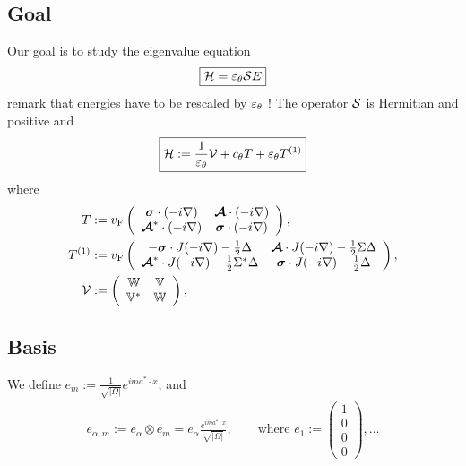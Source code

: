 \documentclass[11pt,a4paper,reqno,french,tikz]{amsart}
\newcommand{\ab}[1]{\left|#1\right|} %
\let\p\relax\newcommand{\p}{\psi} %
\newcommand{\f}[2]{\frac{#1}{#2}} %
\newcommand{\mat}[1]{\begin{pmatrix} #1 \end{pmatrix}} %
\newcommand{\bbV}{\mathbb{V}}
\def\bbV{{\mathbb V}}
\def\bbW{{\mathbb W}}
\begin{document}
\subsection{Goal}%
\label{sub:goal}
Our goal is to study the eigenvalue equation
\begin{align*}
\boxed{\cH \p = \ep_\theta \cS E \p}
\end{align*}
remark that energies have to be rescaled by $\varepsilon_\theta$ ! The operator $\mathcal{S}$ is Hermitian and positive and
\begin{align*}
\boxed{\cH := \f{1}{\ep_\theta} \cV + c_\theta T + \ep_\theta T^{(1)}}
\end{align*}
where
\begin{align*}
T &:=  v_{\rm F} \left( \begin{array}{cc} \bm\sigma \cdot (-i \nabla)  &  \bm{\mathcal A} \cdot (-i\nabla)   \\  \bm{\mathcal A}^* \cdot (-i\nabla) &  \bm\sigma \cdot (-i \nabla)  \end{array} \right),  \\
T^{(1)} &:= v_{\rm F} \left( \begin{array}{cc}  -  \bm\sigma \cdot J (-i \nabla) - \frac 12  \Delta &  \bm{\mathcal A} \cdot J (-i\nabla) - \frac 12  \Sigma \Delta  \\  \bm{\mathcal A}^*  \cdot J (-i\nabla) - \frac 12 \Sigma^* \Delta &  \bm\sigma \cdot J (-i \nabla) - \frac 12   \Delta \end{array} \right), \\
\cV &:=  \left( \begin{array}{cc}  \bbW &   \bbV \\   \bbV^* &   \bbW \end{array} \right),
\end{align*}



\subsection{Basis}%
\label{sub:basis}

We define $e_m := \f{1}{\sqrt{\ab{\Omega}}} e^{i m a^* \cdot x}$, and
\begin{align*}
e_{\alpha,m} := e_\alpha \otimes e_m = e_\alpha \f{e^{ima^*\cdot x}}{\sqrt{\ab{\Omega}}}, \qquad \text{where } e_1 := \mat{1 \\ 0 \\ 0 \\ 0},\dots
\end{align*}
\end{document}
